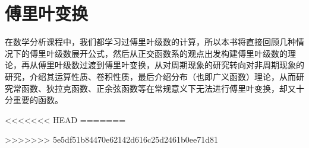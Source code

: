 \chapter{傅里叶变换}%
在数学分析课程中，我们都学习过傅里叶级数的计算，所以本书将直接回顾几种情况下的傅里叶级数展开公式，然后从正交函数系的观点出发构建傅里叶级数的理论，再从傅里叶级数过渡到傅里叶变换，从对周期现象的研究转向对非周期现象的研究，介绍其运算性质、卷积性质，最后介绍分布（也即广义函数）理论，从而研究常函数、狄拉克函数、正余弦函数等在常规意义下无法进行傅里叶变换，却又十分重要的函数。





<<<<<<< HEAD
=======

>>>>>>> 5e5df51b84470e62142d616c25d2461b0ee71d81

